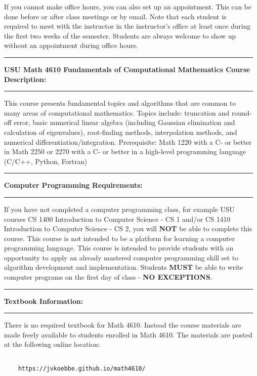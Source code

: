 \documentclass[10pt,fleqn]{article}
\begin{document}
\smallskip\noindent
If you cannot make office hours, you can also set up an appointment. This can be
done before or after class meetings or by email. Note that each student is
required to meet with the instructor in the instructor's office at least once
during the first two weeks of the semester. Students are always welcome to show
up without an appointment during office hours.
\vskip0.1in\hrule\vskip0.1in
\noindent
{\bf USU Math 4610 Fundamentals of Computational Mathematics Course
     Description:}
\vskip0.1in\hrule\vskip0.1in
\noindent
This course presents fundamental topics and algorithms that are common to many
areas of computational mathematics. Topics include: truncation and round-off
error, basic numerical linear algebra (including Gaussian elimination and
calculation of eigenvalues), root-finding methods, interpolation methods, and
numerical differentiation/integration. Prerequisite: Math 1220 with a C- or
better in Math 2250 or 2270 with a C- or better in a high-level programming
language (C/C++, Python, Fortran) 
\vskip0.1in\hrule\vskip0.1in
\noindent
{\bf Computer Programming Requirements:}
\vskip0.1in\hrule\vskip0.1in
\noindent
If you have not completed a computer programming class, for example USU courses
CS 1400 Introduction to Computer Science - CS 1 and/or CS 1410 Introduction to
Computer Science - CS 2, you will {\bf NOT} be able to complete this course.
This course is not intended to be a platform for learning a computer programming
language. This course is intended to provide students with an opportunity to
apply an already mastered computer programming skill set to algorithm
development and implementation. Students {\bf MUST} be able to write computer
programs on the first day of class - {\bf NO EXCEPTIONS}.
\vskip0.1in\hrule\vskip0.1in
\noindent
{\bf Textbook Information:}
\vskip0.1in\hrule\vskip0.1in
\noindent
There is no required textbook for Math 4610. Instead the course materials are
made freely available to students enrolled in Math 4610. The materials are
posted at the following online location:
\begin{verbatim}

    https://jvkoebbe.github.io/math4610/
 
\end{verbatim}
\end{document}
